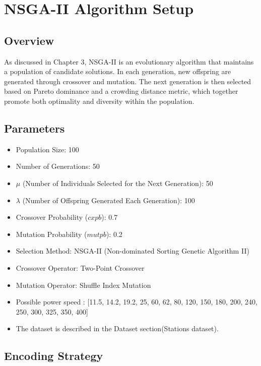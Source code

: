 \section{NSGA-II Algorithm Setup}

\subsection{Overview}

As discussed in Chapter 3, NSGA-II is an evolutionary algorithm that maintains a population of candidate solutions. In each generation, new offspring are generated through crossover and mutation. The next generation is then selected based on Pareto dominance and a crowding distance metric, which together promote both optimality and diversity within the population.

\subsection{Parameters}

\begin{itemize}
    \item Population Size: 100
    \item Number of Generations: 50
    \item $\mu$ (Number of Individuals Selected for the Next Generation): 50
    \item $\lambda$ (Number of Offspring Generated Each Generation): 100
    \item Crossover Probability ($cxpb$): 0.7
    \item Mutation Probability ($mutpb$): 0.2
    \item Selection Method: NSGA-II (Non-dominated Sorting Genetic Algorithm II)
    \item Crossover Operator: Two-Point Crossover
    \item Mutation Operator: Shuffle Index Mutation
    \item Possible power speed : [11.5, 14.2, 19.2, 25, 60, 62, 80, 120, 150, 180, 200, 240, 250, 300, 325, 350, 400]
    \item The dataset is described in the Dataset section(Stations dataset).

\end{itemize}

\subsection{Encoding Strategy}


